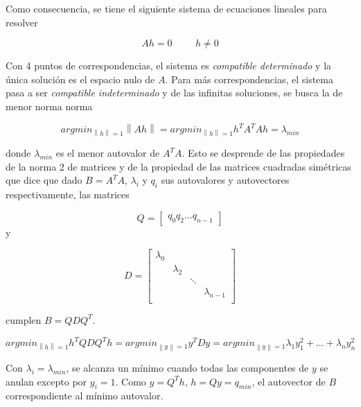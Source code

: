 \documentclass[a4paper,10pt]{article}
\newcommand{\norm}[1]{\left\lVert#1\right\rVert}
\begin{document}
Como consecuencia, se tiene el siguiente sistema de ecuaciones lineales para resolver

\begin{equation}
    Ah = 0 \hspace{1cm} h \neq 0
\end{equation}

Con 4 puntos de correspondencias, el sistema es \textit{compatible determinado} y la única solución es el espacio nulo de $A$. Para más correspondencias,
el sistema pasa a ser \textit{compatible indeterminado} y de las infinitas soluciones, se busca la de menor norma norma

\begin{equation}
    argmin_{\norm{h}=1} \norm{Ah} = argmin_{\norm{h}=1} h^{T}A^{T}Ah = \lambda_{min}
\end{equation}

donde $\lambda_{min}$ es el menor autovalor de $A^{T}A$. Esto se desprende de las propiedades de la norma 2 de matrices y de la propiedad de
las matrices cuadradas simétricas que dice que dado $B = A^{T}A$, $\lambda_{i}$ y $q_{i}$ sus autovalores y autovectores respectivamente, las matrices

\begin{equation}
    Q = \begin{bmatrix}
            q_{0} q_{2} \dots q_{n-1}
        \end{bmatrix}
\end{equation}
y

\begin{equation}
    D = \begin{bmatrix}
            \lambda_{0} & & & \\
                        & \lambda_{2} & & \\
                        & & \ddots & \\
                        & & & \lambda_{n-1}\\
        \end{bmatrix}
\end{equation}

cumplen $B = QDQ^{T}$.

\begin{equation}
    argmin_{\norm{h}=1} h^{T}QDQ^{T}h = argmin_{\norm{y}=1} y^{T}Dy = argmin_{\norm{y}=1} \lambda_{1}y^{2}_{1} + ... + \lambda_{n}y^{2}_{n}
\end{equation}

Con $\lambda_{i} = \lambda_{min}$, se alcanza un mínimo cuando todas las componentes de $y$ se anulan excepto por $y_{i} = 1$. Como $y = Q^{T}h$,
$h=Qy = q_{min}$, el autovector de $B$ correspondiente al mínimo autovalor.
\end{document}
